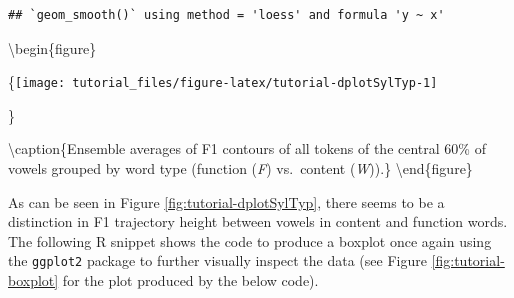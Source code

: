 \documentclass[]{book}
\newenvironment{Shaded}{\begin{snugshade}}{\end{snugshade}}
\newcommand{\CommentTok}[1]{\textcolor[rgb]{0.56,0.35,0.01}{\textit{#1}}}
\newcommand{\DataTypeTok}[1]{\textcolor[rgb]{0.13,0.29,0.53}{#1}}
\newcommand{\FloatTok}[1]{\textcolor[rgb]{0.00,0.00,0.81}{#1}}
\newcommand{\KeywordTok}[1]{\textcolor[rgb]{0.13,0.29,0.53}{\textbf{#1}}}
\newcommand{\NormalTok}[1]{#1}
\newcommand{\OperatorTok}[1]{\textcolor[rgb]{0.81,0.36,0.00}{\textbf{#1}}}
\newcommand{\StringTok}[1]{\textcolor[rgb]{0.31,0.60,0.02}{#1}}
\begin{document}
\begin{Shaded}
\end{Shaded}

\begin{verbatim}
## `geom_smooth()` using method = 'loess' and formula 'y ~ x'
\end{verbatim}

\textbackslash{}begin\{figure\}

\{\centering \texttt{[image: tutorial\_files/figure-latex/tutorial-dplotSylTyp-1]}

\}

\textbackslash{}caption\{Ensemble averages of F1 contours of all tokens of the central 60\% of vowels grouped by word type (function (\emph{F}) vs.~content (\emph{W})).\}\label{fig:tutorial-dplotSylTyp}
\textbackslash{}end\{figure\}

As can be seen in Figure \ref{fig:tutorial-dplotSylTyp}, there seems to be a distinction in F1 trajectory height between vowels in content and function words. The following R snippet shows the code to produce a boxplot once again using the \texttt{ggplot2} package to further visually inspect the data (see Figure \ref{fig:tutorial-boxplot} for the plot produced by the below code).
\end{document}

